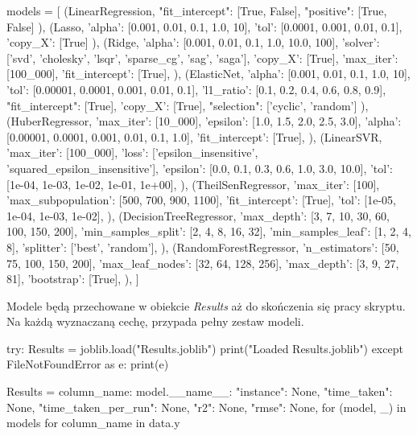 \begin{pythoncode}
models = [
    (LinearRegression, {
        "fit_intercept": [True, False],
        "positive": [True, False]
    }),
    (Lasso, {
        'alpha': [0.001, 0.01, 0.1, 1.0, 10],
        'tol': [0.0001, 0.001, 0.01, 0.1],
        'copy_X': [True]
    }),
    (Ridge, {
        'alpha': [0.001, 0.01, 0.1, 1.0, 10.0, 100],
        'solver': ['svd', 'cholesky', 'lsqr', 'sparse_cg', 'sag', 'saga'],
        'copy_X': [True],
        'max_iter': [100_000],
        'fit_intercept': [True],
    }),
    (ElasticNet, {
        'alpha': [0.001, 0.01, 0.1, 1.0, 10],
        'tol': [0.00001, 0.0001, 0.001, 0.01, 0.1],
        'l1_ratio': [0.1, 0.2, 0.4, 0.6, 0.8, 0.9],
        "fit_intercept": [True],
        'copy_X': [True],
        "selection": ['cyclic', 'random']
    }),
    (HuberRegressor, {
        'max_iter': [10_000],
        'epsilon': [1.0, 1.5, 2.0, 2.5, 3.0],
        'alpha': [0.00001, 0.0001, 0.001, 0.01, 0.1, 1.0],
        'fit_intercept': [True],
    }),
    (LinearSVR, {
        'max_iter': [100_000],
        'loss': ['epsilon_insensitive', 'squared_epsilon_insensitive'],
        'epsilon': [0.0, 0.1, 0.3, 0.6, 1.0, 3.0, 10.0],
        'tol': [1e-04, 1e-03, 1e-02, 1e-01, 1e+00],
    }),
    (TheilSenRegressor, {
        'max_iter': [100],
        'max_subpopulation': [500, 700, 900, 1100],
        'fit_intercept': [True],
        'tol': [1e-05, 1e-04, 1e-03, 1e-02],
    }),
    (DecisionTreeRegressor, {
        'max_depth': [3, 7, 10, 30, 60, 100, 150, 200],
        'min_samples_split': [2, 4, 8, 16, 32],
        'min_samples_leaf': [1, 2, 4, 8],
        'splitter': ['best', 'random'],
    }),
\hspace{1.5cm}     (RandomForestRegressor, {
        'n_estimators': [50, 75, 100, 150, 200],
        'max_leaf_nodes': [32, 64, 128, 256],
        'max_depth': [3, 9, 27, 81],
        'bootstrap': [True],
    }),
]
\end{pythoncode}


\hspace{1.5cm} Modele będą przechowane w obiekcie \textit{Results} aż do skończenia się pracy skryptu. 
Na każdą wyznaczaną cechę, przypada pełny zestaw modeli.
\begin{pythoncode}
try:
    Results = joblib.load("Results.joblib")
    print("Loaded Results.joblib")
except FileNotFoundError as e:
    print(e)

    Results = {
        column_name: {
            model.__name__: {
                "instance": None,
                "time_taken": None,
                "time_taken_per_run": None,
                "r2": None,
                "rmse": None,
            }
            for (model, _) in models
        }
        for column_name in data.y
    }
\end{pythoncode}


